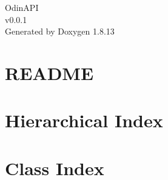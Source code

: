\documentclass[twoside]{book}
\newcommand{\+}{\discretionary{\mbox{\scriptsize$\hookleftarrow$}}{}{}}
\newcommand{\clearemptydoublepage}{%
  \newpage{\pagestyle{empty}\cleardoublepage}%
}
\begin{document}
\hypersetup{pageanchor=false,
             bookmarksnumbered=true,
             pdfencoding=unicode
            }
\begin{titlepage}
\vspace*{7cm}
\begin{center}%
{\Large Odin\+A\+PI \\[1ex]\large v0.\+0.\+1 }\\
\vspace*{1cm}
{\large Generated by Doxygen 1.8.13}\\
\end{center}
\end{titlepage}
\clearemptydoublepage
{}
\tableofcontents
\clearemptydoublepage
{}
\hypersetup{pageanchor=true}

\chapter{R\+E\+A\+D\+ME}
\label{md__r_e_a_d_m_e}

\chapter{Hierarchical Index}

\chapter{Class Index}

\end{document}
